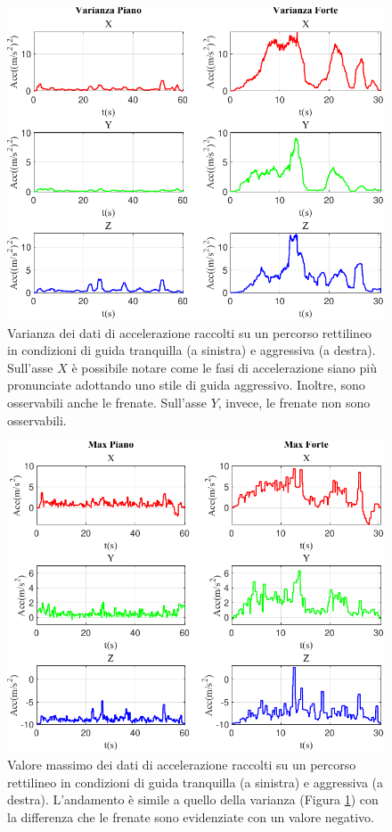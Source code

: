 \documentclass[class=article]{standalone}
\begin{document}
	\begin{center}
		\begin{figure}[h!]
			\centering\includegraphics[width=.7\textwidth]{img/lungaFP/Acc/Varianza}
			\caption[]{Varianza dei dati di accelerazione raccolti su un percorso rettilineo in condizioni di guida tranquilla (a sinistra) e aggressiva (a destra). Sull'asse \(X\) è possibile notare come le fasi di accelerazione siano più pronunciate adottando uno stile di guida aggressivo. Inoltre, sono osservabili anche le frenate. Sull'asse \(Y\), invece, le frenate non sono osservabili.}
			\label{fig:AccVar_lungaFP}
		\end{figure}
	\end{center}
	
	\begin{center}
		\begin{figure}[h!]
			\centering\includegraphics[width=.7\textwidth]{img/lungaFP/Acc/Max}
			\caption[]{Valore massimo dei dati di accelerazione raccolti su un percorso rettilineo in condizioni di guida tranquilla (a sinistra) e aggressiva (a destra). L'andamento è simile a quello della varianza (Figura \ref{fig:AccVar_lungaFP}) con la differenza che le frenate sono evidenziate con un valore negativo.}
			\label{fig:AccMax_lungaFP}
		\end{figure}
	\end{center}
	
\end{document}
